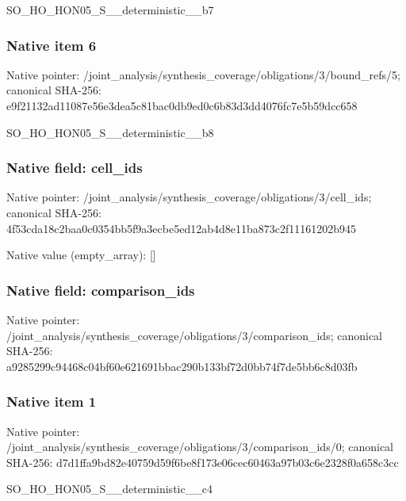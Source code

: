 \documentclass[10pt,a4paper]{article}
\begin{document}
\begingroup\raggedright\sloppy SO\_\allowbreak{}HO\_\allowbreak{}HON05\_\allowbreak{}S\_\allowbreak{}\_\allowbreak{}deterministic\_\allowbreak{}\_\allowbreak{}b7\par\endgroup

\subsubsection{Native item 6}
Native pointer: /joint\_\allowbreak{}analysis/synthesis\_\allowbreak{}coverage/obligations/3/bound\_\allowbreak{}refs/5; canonical SHA-256: e9f21132ad11087e56e3dea5c81bac0db9ed0c6b83d3dd4076fc7e5b59dcc658

\begingroup\raggedright\sloppy SO\_\allowbreak{}HO\_\allowbreak{}HON05\_\allowbreak{}S\_\allowbreak{}\_\allowbreak{}deterministic\_\allowbreak{}\_\allowbreak{}b8\par\endgroup

\subsubsection{Native field: cell\_\allowbreak{}ids}
Native pointer: /joint\_\allowbreak{}analysis/synthesis\_\allowbreak{}coverage/obligations/3/cell\_\allowbreak{}ids; canonical SHA-256: 4f53cda18c2baa0c0354bb5f9a3ecbe5ed12ab4d8e11ba873c2f11161202b945

Native value (empty\_\allowbreak{}array): []

\subsubsection{Native field: comparison\_\allowbreak{}ids}
Native pointer: /joint\_\allowbreak{}analysis/synthesis\_\allowbreak{}coverage/obligations/3/comparison\_\allowbreak{}ids; canonical SHA-256: a9285299c94468c04bf60e621691bbac290b133bf72d0bb74f7de5bb6c8d03fb

\subsubsection{Native item 1}
Native pointer: /joint\_\allowbreak{}analysis/synthesis\_\allowbreak{}coverage/obligations/3/comparison\_\allowbreak{}ids/0; canonical SHA-256: d7d1ffa9bd82e40759d59f6be8f173e06cec60463a97b03c6e2328f0a658c3cc

\begingroup\raggedright\sloppy SO\_\allowbreak{}HO\_\allowbreak{}HON05\_\allowbreak{}S\_\allowbreak{}\_\allowbreak{}deterministic\_\allowbreak{}\_\allowbreak{}c4\par\endgroup
\end{document}
